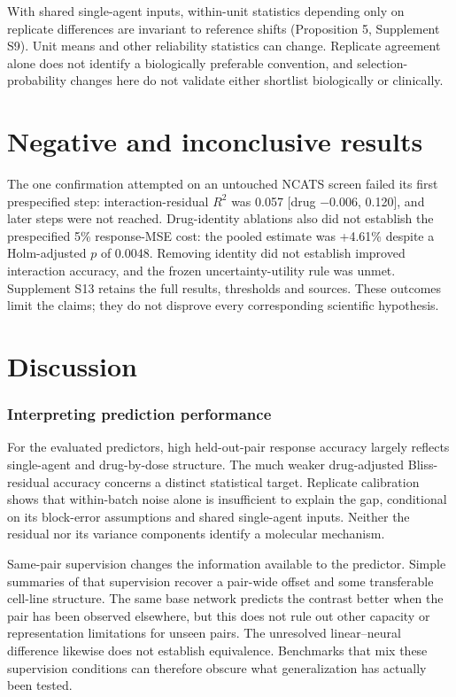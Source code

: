 \documentclass[11pt]{article}
\begin{document}
With shared single-agent inputs, within-unit statistics depending only on replicate differences are invariant to reference shifts (Proposition 5, Supplement S9). Unit means and other reliability statistics can change. Replicate agreement alone does not identify a biologically preferable convention, and selection-probability changes here do not validate either shortlist biologically or clinically.

\section{Negative and inconclusive results}\label{sec:negative}
The one confirmation attempted on an untouched NCATS screen failed its first prespecified step: interaction-residual $R^2$ was 0.057 [drug −0.006, 0.120], and later steps were not reached. Drug-identity ablations also did not establish the prespecified 5\% response-MSE cost: the pooled estimate was +4.61\% despite a Holm-adjusted $p$ of 0.0048. Removing identity did not establish improved interaction accuracy, and the frozen uncertainty-utility rule was unmet. Supplement S13 retains the full results, thresholds and sources. These outcomes limit the claims; they do not disprove every corresponding scientific hypothesis.

\section{Discussion}\label{sec:discussion}
\subsubsection*{Interpreting prediction performance}
For the evaluated predictors, high held-out-pair response accuracy largely reflects single-agent and drug-by-dose structure. The much weaker drug-adjusted Bliss-residual accuracy concerns a distinct statistical target. Replicate calibration shows that within-batch noise alone is insufficient to explain the gap, conditional on its block-error assumptions and shared single-agent inputs. Neither the residual nor its variance components identify a molecular mechanism.

Same-pair supervision changes the information available to the predictor. Simple summaries of that supervision recover a pair-wide offset and some transferable cell-line structure. The same base network predicts the contrast better when the pair has been observed elsewhere, but this does not rule out other capacity or representation limitations for unseen pairs. The unresolved linear–neural difference likewise does not establish equivalence. Benchmarks that mix these supervision conditions can therefore obscure what generalization has actually been tested.
\end{document}

